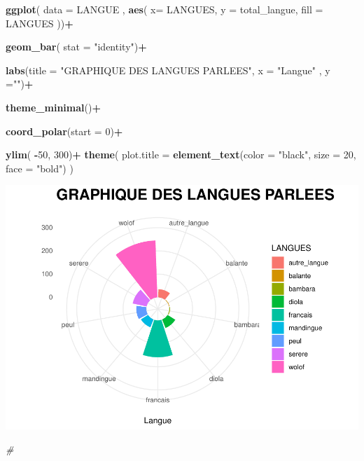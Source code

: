 \documentclass[
]{article}
\newenvironment{Shaded}{\begin{snugshade}}{\end{snugshade}}
\newcommand{\AttributeTok}[1]{\textcolor[rgb]{0.13,0.29,0.53}{#1}}
\newcommand{\CommentTok}[1]{\textcolor[rgb]{0.56,0.35,0.01}{\textit{#1}}}
\newcommand{\DecValTok}[1]{\textcolor[rgb]{0.00,0.00,0.81}{#1}}
\newcommand{\FunctionTok}[1]{\textcolor[rgb]{0.13,0.29,0.53}{\textbf{#1}}}
\newcommand{\NormalTok}[1]{#1}
\newcommand{\SpecialCharTok}[1]{\textcolor[rgb]{0.81,0.36,0.00}{\textbf{#1}}}
\newcommand{\StringTok}[1]{\textcolor[rgb]{0.31,0.60,0.02}{#1}}
\begin{document}
\begin{Shaded}
\begin{Highlighting}[]
\FunctionTok{ggplot}\NormalTok{( }\AttributeTok{data =}\NormalTok{ LANGUE , }\FunctionTok{aes}\NormalTok{( }\AttributeTok{x=}\NormalTok{ LANGUES, }\AttributeTok{y =}\NormalTok{ total\_langue, }\AttributeTok{fill =}\NormalTok{ LANGUES ))}\SpecialCharTok{+}
  
\FunctionTok{geom\_bar}\NormalTok{( }\AttributeTok{stat =} \StringTok{"identity"}\NormalTok{)}\SpecialCharTok{+}
  
  \FunctionTok{labs}\NormalTok{(}\AttributeTok{title =} \StringTok{"GRAPHIQUE DES LANGUES PARLEES"}\NormalTok{,}
       \AttributeTok{x =} \StringTok{"Langue"}\NormalTok{  ,}
       \AttributeTok{y =}\StringTok{""}\NormalTok{)}\SpecialCharTok{+}
  
\FunctionTok{theme\_minimal}\NormalTok{()}\SpecialCharTok{+}
  
\FunctionTok{coord\_polar}\NormalTok{(}\AttributeTok{start =} \DecValTok{0}\NormalTok{)}\SpecialCharTok{+}
  
\FunctionTok{ylim}\NormalTok{( }\SpecialCharTok{{-}}\DecValTok{50}\NormalTok{, }\DecValTok{300}\NormalTok{)}\SpecialCharTok{+}
  \FunctionTok{theme}\NormalTok{(}
    \AttributeTok{plot.title =} \FunctionTok{element\_text}\NormalTok{(}\AttributeTok{color =} \StringTok{"black"}\NormalTok{, }\AttributeTok{size =} \DecValTok{20}\NormalTok{, }\AttributeTok{face =} \StringTok{"bold"}\NormalTok{)}
\NormalTok{  )}
\end{Highlighting}
\end{Shaded}

\includegraphics{PROJET_files/figure-latex/unnamed-chunk-17-1.pdf}

\begin{Shaded}
\begin{Highlighting}[]
\CommentTok{\#}
\end{Highlighting}
\end{Shaded}
\end{document}

